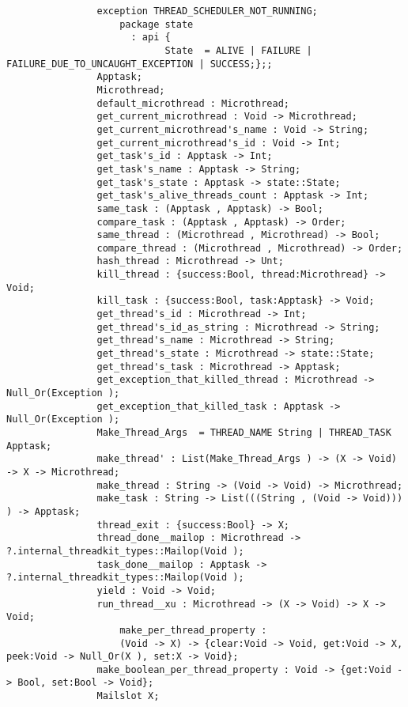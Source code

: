 \begin{verbatim}
                exception THREAD_SCHEDULER_NOT_RUNNING;
                    package state
                      : api {
                            State  = ALIVE | FAILURE | FAILURE_DUE_TO_UNCAUGHT_EXCEPTION | SUCCESS;};;
                Apptask;
                Microthread;
                default_microthread : Microthread;
                get_current_microthread : Void -> Microthread;
                get_current_microthread's_name : Void -> String;
                get_current_microthread's_id : Void -> Int;
                get_task's_id : Apptask -> Int;
                get_task's_name : Apptask -> String;
                get_task's_state : Apptask -> state::State;
                get_task's_alive_threads_count : Apptask -> Int;
                same_task : (Apptask , Apptask) -> Bool;
                compare_task : (Apptask , Apptask) -> Order;
                same_thread : (Microthread , Microthread) -> Bool;
                compare_thread : (Microthread , Microthread) -> Order;
                hash_thread : Microthread -> Unt;
                kill_thread : {success:Bool, thread:Microthread} -> Void;
                kill_task : {success:Bool, task:Apptask} -> Void;
                get_thread's_id : Microthread -> Int;
                get_thread's_id_as_string : Microthread -> String;
                get_thread's_name : Microthread -> String;
                get_thread's_state : Microthread -> state::State;
                get_thread's_task : Microthread -> Apptask;
                get_exception_that_killed_thread : Microthread -> Null_Or(Exception );
                get_exception_that_killed_task : Apptask -> Null_Or(Exception );
                Make_Thread_Args  = THREAD_NAME String | THREAD_TASK Apptask;
                make_thread' : List(Make_Thread_Args ) -> (X -> Void) -> X -> Microthread;
                make_thread : String -> (Void -> Void) -> Microthread;
                make_task : String -> List(((String , (Void -> Void))) ) -> Apptask;
                thread_exit : {success:Bool} -> X;
                thread_done__mailop : Microthread -> ?.internal_threadkit_types::Mailop(Void );
                task_done__mailop : Apptask -> ?.internal_threadkit_types::Mailop(Void );
                yield : Void -> Void;
                run_thread__xu : Microthread -> (X -> Void) -> X -> Void;
                    make_per_thread_property :
                    (Void -> X) -> {clear:Void -> Void, get:Void -> X, peek:Void -> Null_Or(X ), set:X -> Void};
                make_boolean_per_thread_property : Void -> {get:Void -> Bool, set:Bool -> Void};
                Mailslot X;

\end{verbatim}

